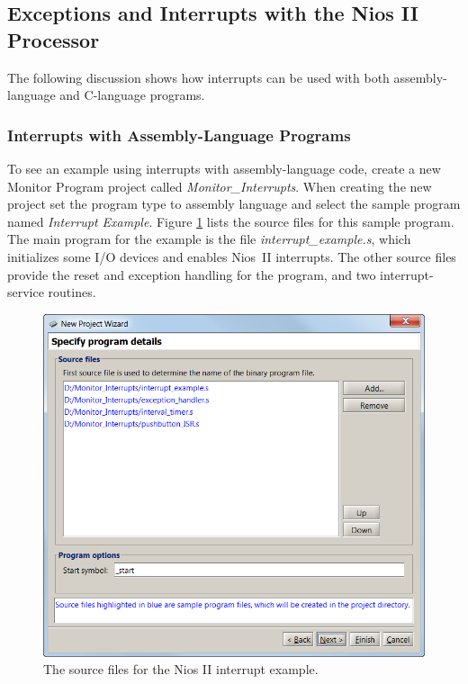 \documentclass[11pt, twoside, pdftex]{article}
\begin{document}
\subsection{Exceptions and Interrupts with the Nios II Processor}
\label{tut:nios_8}

The following discussion shows how interrupts can be used with
both assembly-language and C-language programs.

\subsubsection{Interrupts with Assembly-Language Programs}

To see an example using interrupts with assembly-language code, 
create a new Monitor Program project
called {\it Monitor\_Interrupts}. When creating the new project
set the program type to assembly language and select the sample
program named {\it Interrupt Example}. 
Figure \ref{fig:NPW_interrupts_sourcefiles_nios} lists the source files for this sample program. 
The main program for the example is the file 
{\it interrupt\_example.s}, which initializes some I/O devices
and enables Nios~II interrupts. The other source files provide
the reset and exception handling for the program, and two interrupt-service routines.

\begin{figure}[H]
   \begin{center}
      \includegraphics[scale=1]{screenshots/figure50.png}
   \end{center}
   \caption{The source files for the Nios II interrupt example.} 
   \label{fig:NPW_interrupts_sourcefiles_nios}
\end{figure}
\end{document}
